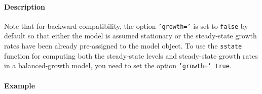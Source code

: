 \paragraph{Description}

Note that for backward compatibility, the option \texttt{'growth='} is
set to \texttt{false} by default so that either the model is assumed
stationary or the steady-state growth rates have been already
pre-assigned to the model object. To use the \texttt{sstate} function
for computing both the steady-state levels and steady-state growth rates
in a balanced-growth model, you need to set the option
\texttt{'growth=' true}.

\paragraph{Example}



